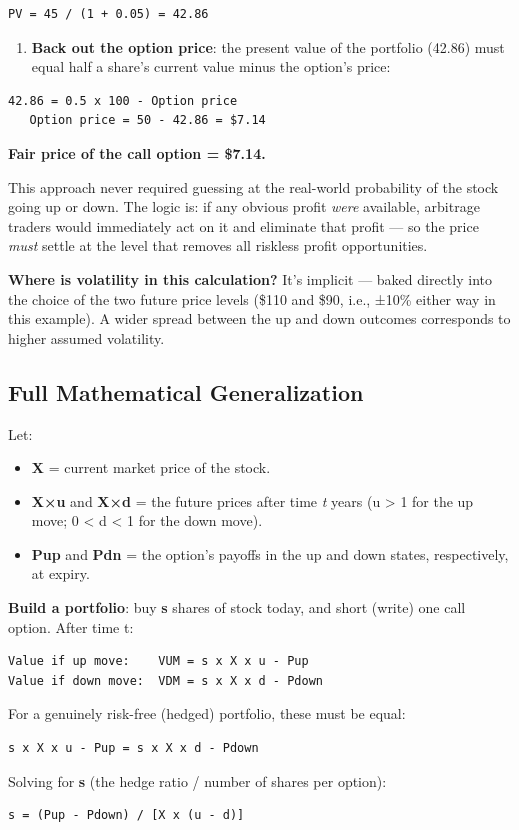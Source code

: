 \documentclass[12pt,openany]{book}
\theoremstyle{definition}
\theoremstyle{remark}
\begin{document}
\begin{lstlisting}[style=notesCode]
   PV = 45 / (1 + 0.05) = 42.86
\end{lstlisting}
\begin{enumerate}
\item \textbf{Back out the option price}: the present value of the portfolio (42.86) must equal half a share's current value minus the option's price:
\end{enumerate}
\begin{lstlisting}[style=notesCode]
   42.86 = 0.5 x 100 - Option price
   Option price = 50 - 42.86 = $7.14
\end{lstlisting}

\textbf{Fair price of the call option = \$7.14.}

This approach never required guessing at the real-world probability of the stock going up or down. The logic is: if any obvious profit \emph{were} available, arbitrage traders would immediately act on it and eliminate that profit — so the price \emph{must} settle at the level that removes all riskless profit opportunities.

\textbf{Where is volatility in this calculation?} It's implicit — baked directly into the choice of the two future price levels (\$110 and \$90, i.e., ±10\% either way in this example). A wider spread between the up and down outcomes corresponds to higher assumed volatility.

\subsection{Full Mathematical Generalization}

Let:
\begin{itemize}
\item \textbf{X} = current market price of the stock.
\item \textbf{X×u} and \textbf{X×d} = the future prices after time \emph{t} years (u > 1 for the up move; 0 < d < 1 for the down move).
\item \textbf{Pup} and \textbf{Pdn} = the option's payoffs in the up and down states, respectively, at expiry.
\end{itemize}
\textbf{Build a portfolio}: buy \textbf{s} shares of stock today, and short (write) one call option. After time t:
\begin{lstlisting}[style=notesCode]
Value if up move:    VUM = s x X x u - Pup
Value if down move:  VDM = s x X x d - Pdown
\end{lstlisting}
For a genuinely risk-free (hedged) portfolio, these must be equal:
\begin{lstlisting}[style=notesCode]
s x X x u - Pup = s x X x d - Pdown
\end{lstlisting}
Solving for \textbf{s} (the hedge ratio / number of shares per option):
\begin{lstlisting}[style=notesCode]
s = (Pup - Pdown) / [X x (u - d)]
\end{lstlisting}
\end{document}
